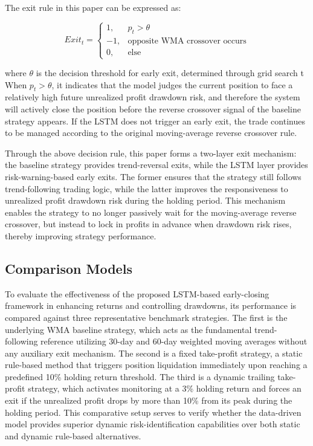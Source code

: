 \documentclass[12pt]{article}
\begin{document}
The exit rule in this paper can be expressed as:

\begin{equation}
    Exit_t =
    \begin{cases}
    1, & p_t > \theta \\
    -1, & \text{opposite WMA crossover occurs} \\
    0, & \text{else}
    \end{cases}
\end{equation}

where $\theta$ is the decision threshold for early exit, determined through grid search%
t%
When $p_t > \theta$, it indicates 
that the model judges the current position to face a relatively high future unrealized profit 
drawdown risk, and therefore the system will actively close the position before the reverse 
crossover signal of the baseline strategy appears. If the LSTM does not trigger an early exit, 
the trade continues to be managed according to the original moving-average reverse crossover 
rule.

Through the above decision rule, this paper forms a two-layer exit mechanism: the baseline 
strategy provides trend-reversal exits, while the LSTM layer provides risk-warning-based early 
exits. The former ensures that the strategy still follows trend-following trading logic, while 
the latter improves the responsiveness to unrealized profit drawdown risk during the holding 
period. This mechanism enables the strategy to no longer passively wait for the moving-average 
reverse crossover, but instead to lock in profits in advance when drawdown risk rises, thereby 
improving strategy performance.

\subsection{Comparison Models}\label{subsec:comparison_models}

To evaluate the effectiveness of the proposed LSTM-based early-closing framework in enhancing 
returns and controlling drawdowns, its performance is compared against three representative 
benchmark strategies. The first is the underlying WMA baseline strategy, which acts as the 
fundamental trend-following reference utilizing 30-day and 60-day weighted moving averages 
without any auxiliary exit mechanism. The second is a fixed take-profit strategy, a static 
rule-based method that triggers position liquidation immediately upon reaching a predefined 
10\% holding return threshold. The third is a dynamic trailing take-profit strategy, which 
activates monitoring at a 3\% holding return and forces an exit if the unrealized profit 
drops by more than 10\% from its peak during the holding period. This comparative setup 
serves to verify whether the data-driven model provides superior dynamic risk-identification 
capabilities over both static and dynamic rule-based alternatives. 
\end{document}
